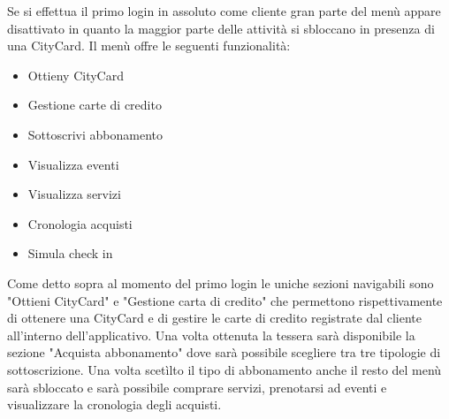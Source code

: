 Se si effettua il primo login in assoluto come cliente gran parte del menù appare disattivato in quanto la maggior parte delle attività si sbloccano in presenza di una CityCard.
Il menù offre le seguenti funzionalità:
\begin{itemize}
    \item Ottieny CityCard
    \item Gestione carte di credito
    \item Sottoscrivi abbonamento
    \item Visualizza eventi
    \item Visualizza servizi
    \item Cronologia acquisti
    \item Simula check in
\end{itemize}
Come detto sopra al momento del primo login le uniche sezioni navigabili sono "Ottieni CityCard" e "Gestione carta di credito" che permettono rispettivamente di ottenere una CityCard e di gestire le carte di credito registrate dal cliente all'interno dell'applicativo.
Una volta ottenuta la tessera sarà disponibile la sezione "Acquista abbonamento" dove sarà possibile scegliere tra tre tipologie di sottoscrizione.  
Una volta scetìlto il tipo di abbonamento anche il resto del menù sarà sbloccato e sarà possibile comprare servizi, prenotarsi ad eventi e visualizzare la cronologia degli acquisti.
